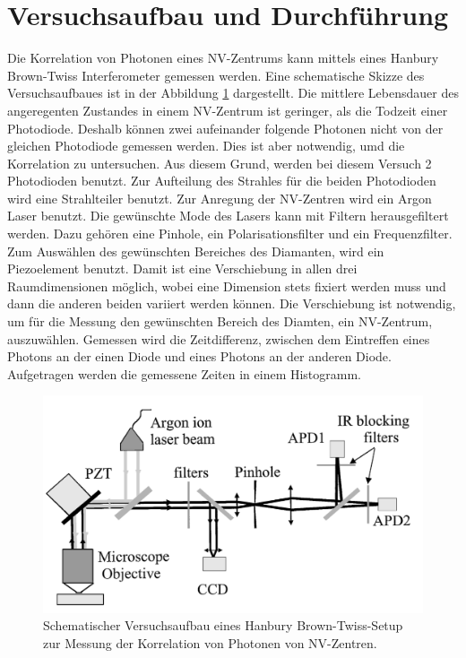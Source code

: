 \section{Versuchsaufbau und Durchf\"uhrung}
Die Korrelation von Photonen eines NV-Zentrums kann mittels eines  Hanbury Brown-Twiss Interferometer
gemessen werden. Eine schematische Skizze des Versuchsaufbaues ist in der Abbildung \ref{fig:Versuchsaufbau} dargestellt. 
Die mittlere Lebensdauer des angeregenten Zustandes in einem NV-Zentrum ist geringer, als die Todzeit einer Photodiode. 
Deshalb k\"onnen zwei aufeinander folgende Photonen nicht von der gleichen Photodiode gemessen werden. 
Dies ist aber notwendig, umd die Korrelation zu untersuchen. Aus diesem Grund, werden bei diesem Versuch 2 Photodioden benutzt. 
Zur Aufteilung des Strahles für die beiden Photodioden wird eine Strahlteiler benutzt. Zur Anregung der NV-Zentren wird ein Argon Laser benutzt. 
Die gewünschte Mode des Lasers kann mit Filtern herausgefiltert werden. Dazu gehören eine Pinhole, ein Polarisationsfilter und ein Frequenzfilter.  
Zum Ausw\"ahlen des gew\"unschten Bereiches des Diamanten, wird ein Piezoelement benutzt. 
Damit ist eine Verschiebung in allen drei Raumdimensionen m\"oglich, wobei eine Dimension stets fixiert werden muss und dann die anderen beiden variiert werden k\"onnen. 
Die Verschiebung ist notwendig, um f\"ur die Messung den gew\"unschten Bereich des Diamten, ein NV-Zentrum, auszuw\"ahlen. Gemessen wird die Zeitdifferenz, zwischen dem Eintreffen eines Photons an der einen Diode und eines Photons an der anderen Diode. 
Aufgetragen werden die gemessene Zeiten in einem Histogramm.   
\begin{figure}[H]
\centering
\includegraphics[scale=0.5]{Versuchsaufbau.PNG}
\caption{Schematischer Versuchsaufbau eines Hanbury Brown-Twiss-Setup zur Messung der Korrelation von Photonen von NV-Zentren. \cite{brouri}  }
\label{fig:Versuchsaufbau}
\end{figure}
